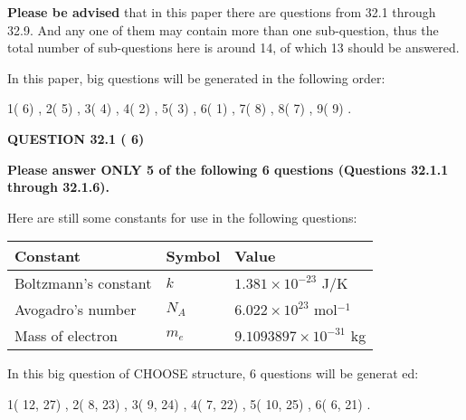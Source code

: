 \documentclass[12pt]{article}
\begin{document}
 
{\textbf{\large{Please be advised}}} that in this paper there are questions from
32.1 through
32.9.
And any one of them may contain more than one sub-question, thus the total number
of sub-questions here is around 14, of which
13 should be answered.
 
\vspace{0.3in}
 
 
   
   
   
\vspace{0.2in}
   
In this paper, big questions will be generated in the following order: 
   
   
            1(          6)
 ,
            2(          5)
 ,
            3(          4)
 ,
            4(          2)
 ,
            5(          3)
 ,
            6(          1)
 ,
            7(          8)
 ,
            8(          7)
 ,
            9(          9)
 .
  
\vspace{0.2in}
  
{\textbf{\Large{QUESTION
32.1 
 (          6)
}}}
  
  
 
{\textbf{\Large{Please answer ONLY
5 of the following
6 questions (Questions
32.1.1 through
32.1.6). }}}
 
Here are still some constants for use in the following questions:
 
 
\noindent\begin{tabular}{|l|l|l|}
\hline
Constant & Symbol & Value \\
\hline
 
Boltzmann's constant &
$k$ &
 $ 1.381 \times 10^{-23} $
J/K \\
\hline
 
Avogadro's number &
$N_A$ &
 $ 6.022 \times 10^{23} $
mol$^{-1}$ \\
\hline
 
Mass of electron &
$m_e$ &
 $ 9.1093897 \times 10^{-31} $
kg \\
\hline
 
\end{tabular}
 
   
\vspace{0.2in}
   
 In this big question of CHOOSE structure,           6 questions will be generat
 ed: 
  
  
            1(         12,         27)
 ,
            2(          8,         23)
 ,
            3(          9,         24)
 ,
            4(          7,         22)
 ,
            5(         10,         25)
 ,
            6(          6,         21)
 .
  
\end{document}
